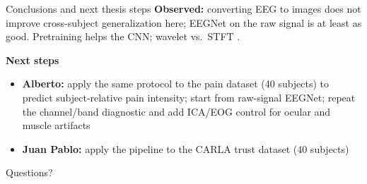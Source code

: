 \documentclass[aspectratio=169,11pt]{beamer}
\begin{document}
\begin{frame}{Conclusions and next thesis steps}
\textbf{Observed:} converting EEG to images does not improve cross-subject generalization here; EEGNet on the raw signal is at least as good. Pretraining helps the CNN; wavelet vs.\ STFT \stftShort.

\medskip
\textbf{Next steps}
\begin{itemize}
\item \textbf{Alberto:} apply the same protocol to the pain dataset (40 subjects) to predict subject-relative pain intensity; start from raw-signal EEGNet; repeat the channel/band diagnostic and add ICA/EOG control for ocular and muscle artifacts
\item \textbf{Juan Pablo:} apply the pipeline to the CARLA trust dataset (40 subjects)
\end{itemize}

\medskip
\centering\large Questions?
\end{frame}
\end{document}
